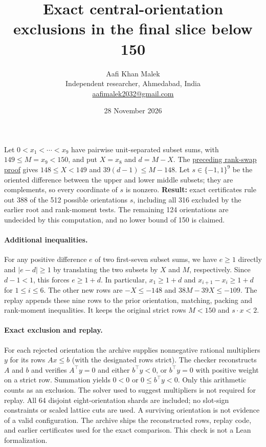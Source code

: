 \documentclass[11pt,letterpaper]{article}
\title{Exact central-orientation exclusions in the final slice below 150}
\author{Aafi Khan Malek\\ \small Independent researcher, Ahmedabad, India\\
\small\href{mailto:aafimalek2032@gmail.com}{aafimalek2032@gmail.com}}
\date{28 November 2026}
\begin{document}
\maketitle
Let \(0<x_1<\cdots<x_9\) have pairwise unit-separated subset sums, with
\(149\le M=x_9<150\), and put \(X=x_8\) and \(d=M-X\).
The \href{https://github.com/Aafimalek/novel-discoveries/tree/c582f2587588eeeb195048a74552fe80bdc1d0e7/nine-separated-subset-sums/verification/rank-cuts-below-150/only-floor-148}{preceding rank-swap proof}
gives \(148\le X<149\) and \(39(d-1)\le M-148\).
Let \(s\in\{-1,1\}^9\) be the oriented difference between the upper
and lower middle subsets; they are complements, so every coordinate of
\(s\) is nonzero.
\textbf{Result:} exact certificates rule out 388 of the 512 possible
orientations \(s\), including all 316 excluded by the earlier root and
rank-moment tests. The remaining 124 orientations are undecided by
this computation, and no lower bound of 150 is claimed.

\paragraph{Additional inequalities.}
For any positive difference \(e\) of two first-seven subset sums, we
have \(e\ge1\) directly and \(\lvert e-d\rvert\ge1\) by translating the
two subsets by \(X\) and \(M\), respectively. Since \(d-1<1\), this
forces \(e\ge1+d\). In particular, \(x_1\ge1+d\) and
\(x_{i+1}-x_i\ge1+d\) for \(1\le i\le6\).
The other new rows are \(-X\le-148\) and \(38M-39X\le-109\).
The replay appends these nine rows to the prior orientation, matching,
packing and rank-moment inequalities. It keeps the original strict rows
\(M<150\) and \(s\cdot x<2\).

\paragraph{Exact exclusion and replay.}
For each rejected orientation the archive supplies nonnegative rational
multipliers \(y\) for its rows \(Ax\le b\) (with the designated rows
strict). The checker reconstructs \(A\) and \(b\) and verifies
\(A^\top y=0\) and either \(b^\top y<0\), or \(b^\top y=0\)
with positive weight on a strict row. Summation yields \(0<0\) or
\(0\le b^\top y<0\). Only this arithmetic counts as an
exclusion. The solver used to suggest multipliers is not required for
replay. All 64 disjoint eight-orientation shards are included; no
slot-sign constraints or scaled lattice cuts are used. A surviving
orientation is not evidence of a valid configuration. The archive ships
the reconstructed rows, replay code, and earlier certificates used for
the exact comparison. This check is not a Lean formalization.
\end{document}

